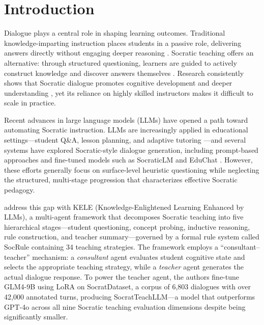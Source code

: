 \documentclass[11pt]{article}
\begin{document}
\section{Introduction}

Dialogue plays a central role in shaping learning outcomes. Traditional knowledge-imparting instruction places students in a passive role, delivering answers directly without engaging deeper reasoning \citep{johnston1994teaching}. Socratic teaching offers an alternative: through structured questioning, learners are guided to actively construct knowledge and discover answers themselves \citep{seeskin1987socratic, chang1998socratic}. Research consistently shows that Socratic dialogue promotes cognitive development and deeper understanding \citep{knezic2010socratic}, yet its reliance on highly skilled instructors makes it difficult to scale in practice.

Recent advances in large language models (LLMs) have opened a path toward automating Socratic instruction. LLMs are increasingly applied in educational settings---student Q\&A, lesson planning, and adaptive tutoring \citep{kasneci2023chatgpt, gan2023llmedu}---and several systems have explored Socratic-style dialogue generation, including prompt-based approaches \citep{zhang2024spl, alhossami2024socratic} and fine-tuned models such as SocraticLM \citep{liu2024socraticLM} and EduChat \citep{dan2023educhat}. However, these efforts generally focus on surface-level heuristic questioning while neglecting the structured, multi-stage progression that characterizes effective Socratic pedagogy.

\citet{peng2025kele} address this gap with KELE (Knowledge-Enlightened Learning Enhanced by LLMs), a multi-agent framework that decomposes Socratic teaching into five hierarchical stages---student questioning, concept probing, inductive reasoning, rule construction, and teacher summary---governed by a formal rule system called SocRule containing 34 teaching strategies. The framework employs a ``consultant--teacher'' mechanism: a \emph{consultant} agent evaluates student cognitive state and selects the appropriate teaching strategy, while a \emph{teacher} agent generates the actual dialogue response. To power the teacher agent, the authors fine-tune GLM4-9B \citep{glm2024chatglm} using LoRA \citep{hu2022lora} on SocratDataset, a corpus of 6,803 dialogues with over 42,000 annotated turns, producing SocratTeachLLM---a model that outperforms GPT-4o across all nine Socratic teaching evaluation dimensions despite being significantly smaller.
\end{document}
